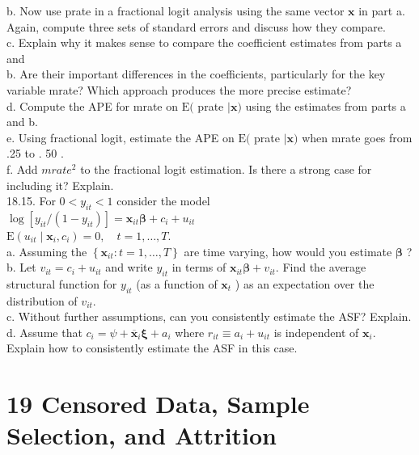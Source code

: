 \documentclass[10pt]{article}
\begin{document}
b. Now use prate in a fractional logit analysis using the same vector $\mathbf{x}$ in part a. Again, compute three sets of standard errors and discuss how they compare.\\
c. Explain why it makes sense to compare the coefficient estimates from parts a and\\
b. Are their important differences in the coefficients, particularly for the key variable mrate? Which approach produces the more precise estimate?\\
d. Compute the APE for mrate on $\mathrm{E}($ prate $\mid \mathbf{x})$ using the estimates from parts a and b.\\
e. Using fractional logit, estimate the APE on $\mathrm{E}($ prate $\mid \mathbf{x})$ when mrate goes from .25 to . 50 .\\
f. Add $m r a t e^{2}$ to the fractional logit estimation. Is there a strong case for including it? Explain.\\
18.15. For $0<y_{i t}<1$ consider the model\\
$\log \left[y_{i t} /\left(1-y_{i t}\right)\right]=\mathbf{x}_{i t} \boldsymbol{\beta}+c_{i}+u_{i t}$\\
$\mathrm{E}\left(u_{i t} \mid \mathbf{x}_{i}, c_{i}\right)=0, \quad t=1, \ldots, T$.\\
a. Assuming the $\left\{\mathbf{x}_{i t}: t=1, \ldots, T\right\}$ are time varying, how would you estimate $\boldsymbol{\beta}$ ?\\
b. Let $v_{i t}=c_{i}+u_{i t}$ and write $y_{i t}$ in terms of $\mathbf{x}_{i t} \boldsymbol{\beta}+v_{i t}$. Find the average structural function for $y_{i t}$ (as a function of $\mathbf{x}_{t}$ ) as an expectation over the distribution of $v_{i t}$.\\
c. Without further assumptions, can you consistently estimate the ASF? Explain.\\
d. Assume that $c_{i}=\psi+\overline{\mathbf{x}}_{i} \boldsymbol{\xi}+a_{i}$ where $r_{i t} \equiv a_{i}+u_{i t}$ is independent of $\mathbf{x}_{i}$. Explain how to consistently estimate the ASF in this case.

\section*{19 Censored Data, Sample Selection, and Attrition}
\end{document}
